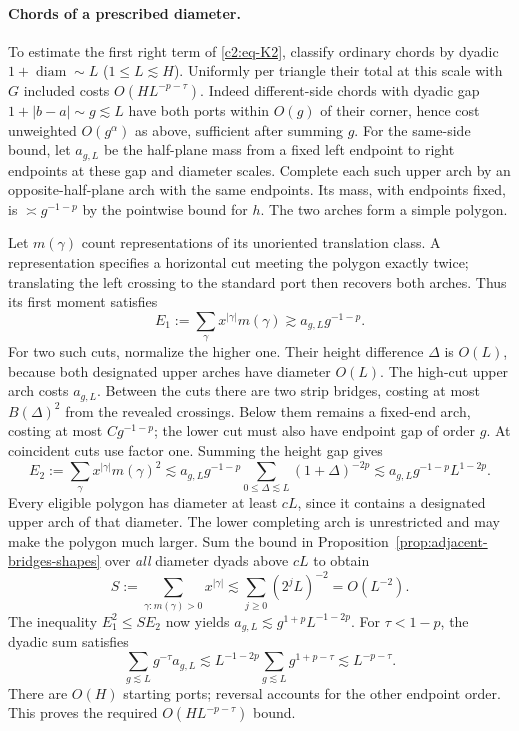 \paragraph{Chords of a prescribed diameter.}
To estimate the first right term of \eqref{c2:eq-K2}, classify ordinary chords by dyadic \(1+\operatorname{diam}\sim L\) (\(1\le L\lesssim H\)). Uniformly per triangle their total at this scale with \(G\) included costs \(O(H L^{-p-\tau})\). Indeed different-side chords with dyadic gap \(1+|b-a|\sim g\lesssim L\) have both ports within \(O(g)\) of their corner, hence cost unweighted \(O(g^\alpha)\) as above, sufficient after summing \(g\). For the same-side bound, let \(a_{g,L}\) be the half-plane mass from
a fixed left endpoint to right endpoints at these gap and diameter
scales. Complete each such upper arch by an opposite-half-plane arch
with the same endpoints. Its mass, with endpoints fixed, is
\(\asymp g^{-1-p}\) by the pointwise bound for \(h\). The two arches form
a simple polygon.

Let \(m(\gamma)\) count representations of its unoriented translation
class. A representation specifies a horizontal cut meeting the polygon
exactly twice; translating the left crossing to the standard port then
recovers both arches. Thus its first moment satisfies
\[
 E_1:=\sum_\gamma x^{|\gamma|}m(\gamma)
 \gtrsim a_{g,L}g^{-1-p}.
\]
For two such cuts, normalize the higher one. Their height difference
\(\Delta\) is \(O(L)\), because both designated upper arches have diameter
\(O(L)\). The high-cut upper arch costs \(a_{g,L}\). Between the cuts
there are two strip bridges, costing at most \(B(\Delta)^2\) from the
revealed crossings. Below them remains a fixed-end arch, costing at most
\(Cg^{-1-p}\); the lower cut must also have endpoint gap of order \(g\).
At coincident cuts use factor one. Summing the height gap gives
\[
 E_2:=\sum_\gamma x^{|\gamma|}m(\gamma)^2
 \lesssim a_{g,L}g^{-1-p}\sum_{0\le\Delta\lesssim L}(1+\Delta)^{-2p}
 \lesssim a_{g,L}g^{-1-p}L^{1-2p}.
\]
Every eligible polygon has diameter at least \(cL\), since it contains
a designated upper arch of that diameter. The lower completing arch is
unrestricted and may make the polygon much larger. Sum the bound in Proposition~\ref{prop:adjacent-bridges-shapes}
over \emph{all} diameter dyads above \(cL\) to obtain
\[
 S:=\sum_{\gamma:m(\gamma)>0}x^{|\gamma|}
 \lesssim\sum_{j\ge0}(2^jL)^{-2}=O(L^{-2}).
\]
The inequality \(E_1^2\le SE_2\) now yields
\(a_{g,L}\lesssim g^{1+p}L^{-1-2p}\). For \(\tau<1-p\), the dyadic sum satisfies
\[
 \sum_{g\lesssim L}g^{-\tau}a_{g,L}
 \lesssim L^{-1-2p}\sum_{g\lesssim L}g^{1+p-\tau}
 \lesssim L^{-p-\tau}.
\]
There are \(O(H)\) starting ports; reversal accounts for the other endpoint
order. This proves the required \(O(HL^{-p-\tau})\) bound.

